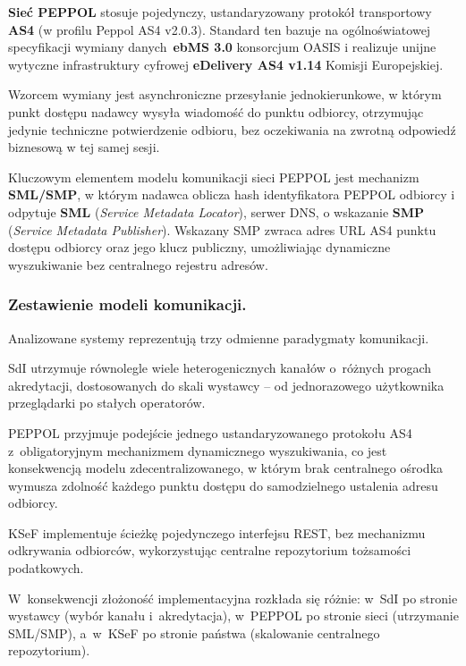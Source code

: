 \textbf{Sieć PEPPOL} stosuje pojedynczy, ustandaryzowany protokół transportowy \textbf{AS4} (w profilu Peppol AS4 v2.0.3). Standard ten bazuje na ogólnoświatowej specyfikacji wymiany danych~\textbf{ebMS 3.0} konsorcjum OASIS i realizuje unijne wytyczne infrastruktury cyfrowej \textbf{eDelivery AS4 v1.14} Komisji Europejskiej. 

Wzorcem wymiany jest asynchroniczne przesyłanie jednokierunkowe, w którym punkt dostępu nadawcy wysyła wiadomość do punktu odbiorcy, otrzymując jedynie techniczne potwierdzenie odbioru, bez oczekiwania na zwrotną odpowiedź biznesową w tej samej sesji. \cite{peppol-as4-profile,ec-as4-edelivery}

Kluczowym elementem modelu komunikacji sieci PEPPOL jest mechanizm \textbf{SML/SMP}, w którym nadawca oblicza hash identyfikatora PEPPOL odbiorcy i odpytuje \textbf{SML} (\textit{Service Metadata Locator}), serwer DNS, o wskazanie \textbf{SMP} (\textit{Service Metadata Publisher}). Wskazany SMP zwraca adres URL AS4 punktu dostępu odbiorcy oraz jego klucz publiczny, umożliwiając dynamiczne wyszukiwanie bez centralnego rejestru adresów. \cite{peppol-sml-spec}

\subsubsection*{Zestawienie modeli komunikacji.}

Analizowane systemy reprezentują trzy odmienne paradygmaty komunikacji. 

SdI utrzymuje równolegle wiele heterogenicznych kanałów o~różnych progach akredytacji, dostosowanych do skali wystawcy -- od jednorazowego użytkownika przeglądarki po stałych operatorów. 

PEPPOL przyjmuje podejście jednego ustandaryzowanego protokołu AS4 z~obligatoryjnym mechanizmem dynamicznego wyszukiwania, co jest konsekwencją modelu zdecentralizowanego, w którym brak centralnego ośrodka wymusza zdolność każdego punktu dostępu do samodzielnego ustalenia adresu odbiorcy. 

KSeF implementuje ścieżkę pojedynczego interfejsu REST, bez mechanizmu odkrywania odbiorców, wykorzystując centralne repozytorium tożsamości podatkowych. 

W~konsekwencji złożoność implementacyjna rozkłada się różnie: w~SdI po stronie wystawcy (wybór kanału i~akredytacja), w~PEPPOL po stronie sieci (utrzymanie SML/SMP), a~w~KSeF po stronie państwa (skalowanie centralnego repozytorium).

